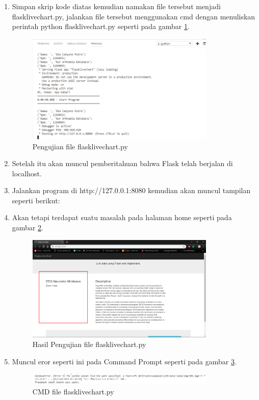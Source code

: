 \begin{enumerate}
\item Simpan skrip kode diatas kemudian namakan file tersebut menjadi flasklivechart.py, jalankan file tersebut menggunakan cmd dengan menuliskan perintah python flasklivechart.py seperti pada gambar \ref{fig:ujiflc}.
\begin{figure}[!htbp]
	\centerline{\includegraphics[width=0.85\textwidth]{figures/9/ujiflc.PNG}}
	\caption{Pengujian file flasklivechart.py}
	\label{fig:ujiflc}
\end{figure}

\item Setelah itu akan muncul pemberitahuan bahwa Flask telah berjalan di localhost.
\item Jalankan program di http://127.0.0.1:8080 kemudian akan muncul tampilan seperti berikut:
\item Akan tetapi terdapat suatu masalah pada halaman home seperti pada gambar \ref{fig:hujiflc}.
\begin{figure}[!htbp]
	\centerline{\includegraphics[width=0.85\textwidth]{figures/9/hujiflc.PNG}}
	\caption{Hasil Pengujian file flasklivechart.py}
	\label{fig:hujiflc}
\end{figure}

\item Muncul eror seperti ini pada Command Prompt seperti pada gambar \ref{fig:errflc}.
\begin{figure}[!htbp]
	\centerline{\includegraphics[width=0.85\textwidth]{figures/9/errflc.PNG}}
	\caption{CMD file flasklivechart.py}
	\label{fig:errflc}
\end{figure}


\end{enumerate}
